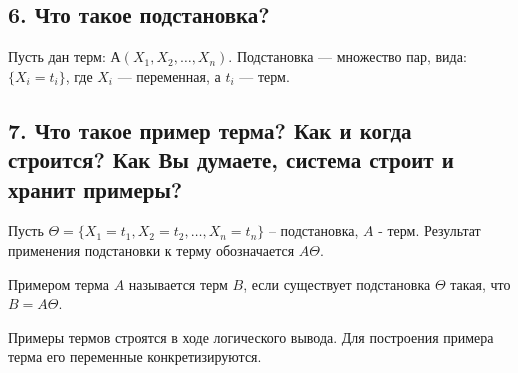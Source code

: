 \subsection*{6. Что такое подстановка?}

Пусть дан терм: $А(X_1, X_2, \ldots , X_n)$.
Подстановка --- множество пар, вида: \\ $\{X _ i = t _ i\}$, где $X_i$ --- переменная, а $t_i$ --- терм.

\subsection*{7. Что такое пример терма? Как и когда строится? Как Вы думаете, система строит и хранит примеры?}

Пусть $\Theta =  \{X_1 = t_1, X_2= t_2, \dots , X_n = t_n \}$   –   подстановка, $A$ - терм. Результат применения подстановки к терму обозначается $A\Theta$.

Примером терма $A$ называется терм $B$, если существует подстановка $\Theta$ такая, что $B = A\Theta$.

Примеры термов строятся в ходе логического вывода. Для построения примера терма его переменные конкретизируются.